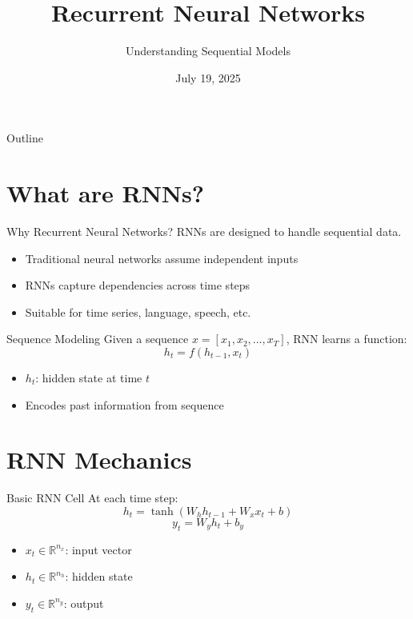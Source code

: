 \documentclass{beamer}
\title{Recurrent Neural Networks}
\subtitle{Understanding Sequential Models}
\date{July 19, 2025}
\begin{document}
{
\begin{frame}
    \titlepage
\end{frame}
}

\begin{frame}{Outline}
    \tableofcontents
\end{frame}

\section{What are RNNs?}
\begin{frame}{Why Recurrent Neural Networks?}
RNNs are designed to handle sequential data.
\begin{itemize}
    \item Traditional neural networks assume independent inputs
    \item RNNs capture dependencies across time steps
    \item Suitable for time series, language, speech, etc.
\end{itemize}
\end{frame}

\begin{frame}{Sequence Modeling}
Given a sequence \( x = [x_1, x_2, \dots, x_T] \), RNN learns a function:
\[
h_t = f(h_{t-1}, x_t)
\]
\begin{itemize}
    \item \( h_t \): hidden state at time \( t \)
    \item Encodes past information from sequence
\end{itemize}
\end{frame}

\section{RNN Mechanics}
\begin{frame}{Basic RNN Cell}
At each time step:
\[
h_t = \tanh(W_h h_{t-1} + W_x x_t + b)
\]
\[
y_t = W_y h_t + b_y
\]
\begin{itemize}
    \item \( x_t \in \mathbb{R}^{n_x} \): input vector
    \item \( h_t \in \mathbb{R}^{n_h} \): hidden state
    \item \( y_t \in \mathbb{R}^{n_y} \): output
\end{itemize}
\end{frame}
\end{document}
